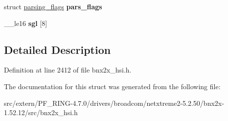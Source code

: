 \begin{DoxyCompactItemize}
\item 
\hypertarget{structeth__fast__path__rx__cqe_a9a177c44e17706beb08d3f8eb9c14bb9}{
struct \hyperlink{structparsing__flags}{parsing\_\-flags} {\bfseries pars\_\-flags}}
\label{structeth__fast__path__rx__cqe_a9a177c44e17706beb08d3f8eb9c14bb9}

\item 
\hypertarget{structeth__fast__path__rx__cqe_a1016b43f2e160cb2029d7f4869c92930}{
\_\-\_\-le16 {\bfseries sgl} \mbox{[}8\mbox{]}}
\label{structeth__fast__path__rx__cqe_a1016b43f2e160cb2029d7f4869c92930}

\end{DoxyCompactItemize}


\subsection{Detailed Description}


Definition at line 2412 of file bnx2x\_\-hsi.h.



The documentation for this struct was generated from the following file:\begin{DoxyCompactItemize}
\item 
src/extern/PF\_\-RING-\/4.7.0/drivers/broadcom/netxtreme2-\/5.2.50/bnx2x-\/1.52.12/src/bnx2x\_\-hsi.h\end{DoxyCompactItemize}
